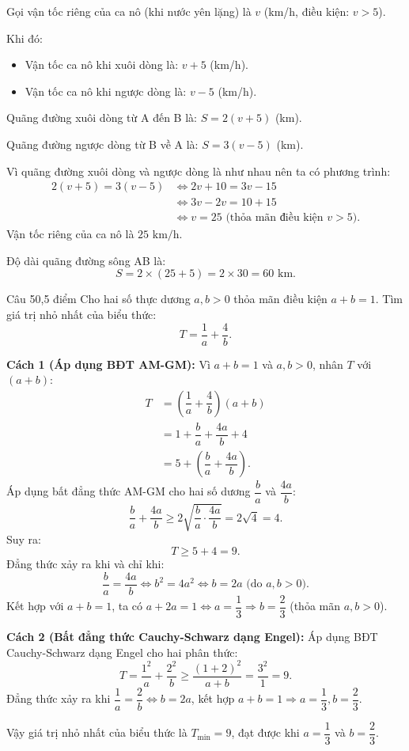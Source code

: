 \begin{loi_giai_cau}
Gọi vận tốc riêng của ca nô (khi nước yên lặng) là $v$ (km/h, điều kiện: $v > 5$).

Khi đó:
\begin{itemize}
  \item Vận tốc ca nô khi xuôi dòng là: $v + 5$ (km/h).
  \item Vận tốc ca nô khi ngược dòng là: $v - 5$ (km/h).
\end{itemize}
Quãng đường xuôi dòng từ A đến B là: $S = 2(v + 5)$ (km).

Quãng đường ngược dòng từ B về A là: $S = 3(v - 5)$ (km).

Vì quãng đường xuôi dòng và ngược dòng là như nhau nên ta có phương trình:
\begin{align*}
2(v + 5) = 3(v - 5) &\Leftrightarrow 2v + 10 = 3v - 15 \\
                    &\Leftrightarrow 3v - 2v = 10 + 15 \\
                    &\Leftrightarrow v = 25 \text{ (thỏa mãn điều kiện } v > 5).
\end{align*}
Vận tốc riêng của ca nô là $25\text{ km/h}$.

Độ dài quãng đường sông AB là:
\[S = 2 \times (25 + 5) = 2 \times 30 = \boxed{60\text{ km}}.\]
\end{loi_giai_cau}

\begin{de_cau}{Câu 5}{0,5 điểm}
Cho hai số thực dương $a, b > 0$ thỏa mãn điều kiện $a + b = 1$. Tìm giá trị nhỏ nhất của biểu thức:
\[T = \dfrac{1}{a} + \dfrac{4}{b}.\]
\end{de_cau}

\begin{loi_giai_cau}
\textbf{Cách 1 (Áp dụng BĐT AM-GM):}
Vì $a + b = 1$ và $a, b > 0$, nhân $T$ với $(a + b)$:
\begin{align*}
T &= \left(\dfrac{1}{a} + \dfrac{4}{b}\right)(a + b) \\
  &= 1 + \dfrac{b}{a} + \dfrac{4a}{b} + 4 \\
  &= 5 + \left(\dfrac{b}{a} + \dfrac{4a}{b}\right).
\end{align*}
Áp dụng bất đẳng thức AM-GM cho hai số dương $\dfrac{b}{a}$ và $\dfrac{4a}{b}$:
\[\dfrac{b}{a} + \dfrac{4a}{b} \ge 2\sqrt{\dfrac{b}{a}\cdot\dfrac{4a}{b}} = 2\sqrt{4} = 4.\]
Suy ra:
\[T \ge 5 + 4 = 9.\]
Đẳng thức xảy ra khi và chỉ khi:
\[\dfrac{b}{a} = \dfrac{4a}{b} \Leftrightarrow b^2 = 4a^2 \Leftrightarrow b = 2a \text{ (do } a, b > 0).\]
Kết hợp với $a + b = 1$, ta có $a + 2a = 1 \Leftrightarrow a = \dfrac{1}{3} \Rightarrow b = \dfrac{2}{3}$ (thỏa mãn $a,b > 0$).

\textbf{Cách 2 (Bất đẳng thức Cauchy-Schwarz dạng Engel):}
Áp dụng BĐT Cauchy-Schwarz dạng Engel cho hai phân thức:
\[T = \dfrac{1^2}{a} + \dfrac{2^2}{b} \ge \dfrac{(1 + 2)^2}{a + b} = \dfrac{3^2}{1} = 9.\]
Đẳng thức xảy ra khi $\dfrac{1}{a} = \dfrac{2}{b} \Leftrightarrow b = 2a$, kết hợp $a + b = 1 \Rightarrow a = \dfrac{1}{3}, b = \dfrac{2}{3}$.

Vậy giá trị nhỏ nhất của biểu thức là $\boxed{T_{\min} = 9}$, đạt được khi $a = \dfrac{1}{3}$ và $b = \dfrac{2}{3}$.
\end{loi_giai_cau}
